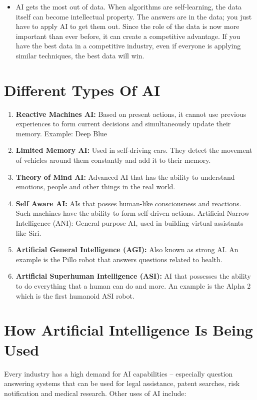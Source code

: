 \documentclass[a4paper, 12pt]{article}
\begin{document}
\begin{itemize}
\item AI gets the most out of data. When algorithms are self-learning, the data itself can become intellectual property. The answers are in the data; you just have to apply AI to get them out. Since the role of the data is now more important than ever before, it can create a competitive advantage. If you have the best data in a competitive industry, even if everyone is applying similar techniques, the best data will win.
\end{itemize}

\section{Different Types Of AI}
\begin{enumerate}
\item \textbf{Reactive Machines AI:} Based on present actions, it cannot use previous experiences to form current decisions and simultaneously update their memory. Example: Deep Blue
\item \textbf{Limited Memory AI:} Used in self-driving cars. They detect the movement of vehicles around them constantly and add it to their memory.
\item \textbf{Theory of Mind AI:} Advanced AI that has the ability to understand emotions, people and other things in the real world.
\item \textbf{Self Aware AI:} AIs that posses human-like consciousness and reactions. Such machines have the ability to form self-driven actions.
Artificial Narrow Intelligence (ANI): General purpose AI, used in building virtual assistants like Siri.
\item \textbf{Artificial General Intelligence (AGI):} Also known as strong AI. An example is the Pillo robot that answers questions related to health.
\item \textbf{Artificial Superhuman Intelligence (ASI):} AI that possesses the ability to do everything that a human can do and more. An example is the Alpha 2 which is the first humanoid ASI robot.
\end{enumerate}

\section{How Artificial Intelligence Is Being Used}
Every industry has a high demand for AI capabilities – especially question answering systems that can be used for legal assistance, patent searches, risk notification and medical research. Other uses of AI include:
\end{document}
